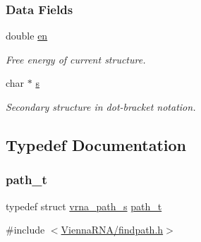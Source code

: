 \subsubsection*{Data Fields}
\begin{DoxyCompactItemize}
\item 
\mbox{\label{group__direct__paths_ac25160bf31d28097358278f367e41227}} 
double \hyperlink{group__direct__paths_ac25160bf31d28097358278f367e41227}{en}
\begin{DoxyCompactList}\small\item\em Free energy of current structure. \end{DoxyCompactList}\item 
\mbox{\label{group__direct__paths_a141b70a59cb81d10bc65bbb7a0f6db77}} 
char $\ast$ \hyperlink{group__direct__paths_a141b70a59cb81d10bc65bbb7a0f6db77}{s}
\begin{DoxyCompactList}\small\item\em Secondary structure in dot-\/bracket notation. \end{DoxyCompactList}\end{DoxyCompactItemize}


\subsection{Typedef Documentation}
\mbox{\label{group__direct__paths_gab6b8737d5377e70a7815d04aae7fd884}} 
\subsubsection{\texorpdfstring{path\+\_\+t}{path\_t}}
{\footnotesize\ttfamily typedef struct \hyperlink{group__direct__paths_structvrna__path__s}{vrna\+\_\+path\+\_\+s} \hyperlink{group__direct__paths_gab6b8737d5377e70a7815d04aae7fd884}{path\+\_\+t}}



{\ttfamily \#include $<$\hyperlink{findpath_8h}{Vienna\+R\+N\+A/findpath.\+h}$>$}



